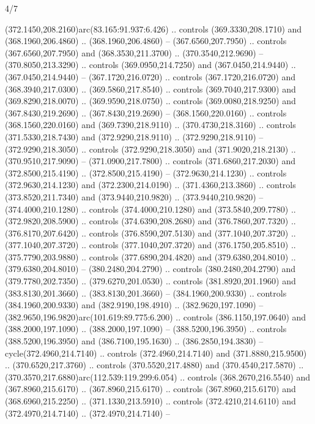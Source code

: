 \begin{flagdescription}{4/7}
\begin{scope}[shift={(0.5\flaglength,0.5\flagwidth)},scale=\flagwidth*\stretchfactor/820]
\begin{scope}[scale=1.87,xshift=-138mm,yshift=75mm]
\begin{scope}[y=0.8pt, x=0.8pt, yscale=-1, xscale=1]
\begin{scope}[cm={{1.16833,0.0,0.0,1.16833,(-0.699,1.184)}},fill=c78732e]
  (372.1450,208.2160)arc(83.165:91.937:6.426) .. controls (369.3330,208.1710)
  and (368.1960,206.4860) .. (368.1960,206.4860) -- (367.6560,207.7950) ..
  controls (367.6560,207.7950) and (368.3530,211.3700) .. (370.3540,212.9690) --
  (370.8050,213.3290) .. controls (369.0950,214.7250) and (367.0450,214.9440) ..
  (367.0450,214.9440) -- (367.1720,216.0720) .. controls (367.1720,216.0720) and
  (368.3940,217.0300) .. (369.5860,217.8540) .. controls (369.7040,217.9300) and
  (369.8290,218.0070) .. (369.9590,218.0750) .. controls (369.0080,218.9250) and
  (367.8430,219.2690) .. (367.8430,219.2690) -- (368.1560,220.0160) .. controls
  (368.1560,220.0160) and (369.7390,218.9110) .. (370.4730,218.3160) .. controls
  (371.5330,218.7430) and (372.9290,218.9110) .. (372.9290,218.9110) --
  (372.9290,218.3050) .. controls (372.9290,218.3050) and (371.9020,218.2130) ..
  (370.9510,217.9090) -- (371.0900,217.7800) .. controls (371.6860,217.2030) and
  (372.8500,215.4190) .. (372.8500,215.4190) -- (372.9630,214.1230) .. controls
  (372.9630,214.1230) and (372.2300,214.0190) .. (371.4360,213.3860) .. controls
  (373.8520,211.7340) and (373.9440,210.9820) .. (373.9440,210.9820) --
  (374.4000,210.1280) .. controls (374.4000,210.1280) and (373.5840,209.7780) ..
  (372.9820,208.5900) .. controls (374.6390,208.2680) and (376.7860,207.7320) ..
  (376.8170,207.6420) .. controls (376.8590,207.5130) and (377.1040,207.3720) ..
  (377.1040,207.3720) .. controls (377.1040,207.3720) and (376.1750,205.8510) ..
  (375.7790,203.9880) .. controls (377.6890,204.4820) and (379.6380,204.8010) ..
  (379.6380,204.8010) -- (380.2480,204.2790) .. controls (380.2480,204.2790) and
  (379.7780,202.7350) .. (379.6270,201.0530) .. controls (381.8920,201.1960) and
  (383.8130,201.3660) .. (383.8130,201.3660) -- (384.1960,200.9330) .. controls
  (384.1960,200.9330) and (382.9190,198.4910) .. (382.9620,197.1090) --
  (382.9650,196.9820)arc(101.619:89.775:6.200) .. controls (386.1150,197.0640)
  and (388.2000,197.1090) .. (388.2000,197.1090) -- (388.5200,196.3950) ..
  controls (388.5200,196.3950) and (386.7100,195.1630) .. (386.2850,194.3830) --
  cycle(372.4960,214.7140) .. controls (372.4960,214.7140) and
  (371.8880,215.9500) .. (370.6520,217.3760) .. controls (370.5520,217.4880) and
  (370.4540,217.5870) .. (370.3570,217.6880)arc(112.539:119.299:6.054) ..
  controls (368.2670,216.5540) and (367.8960,215.6170) .. (367.8960,215.6170) ..
  controls (367.8960,215.6170) and (368.6960,215.2250) .. (371.1330,213.5910) ..
  controls (372.4210,214.6110) and (372.4970,214.7140) .. (372.4970,214.7140) --

\end{scope}
\end{scope}
\end{scope}
\end{scope}
\end{flagdescription}
